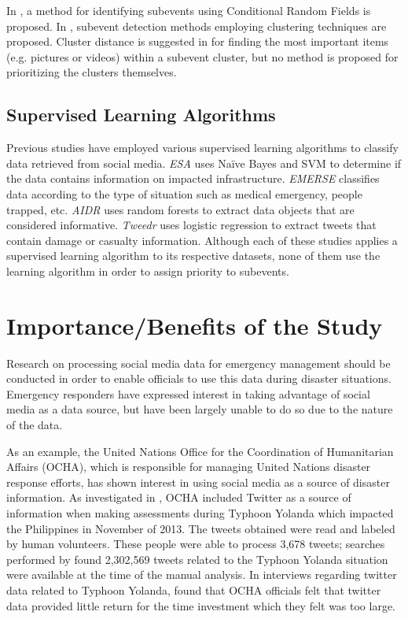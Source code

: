 \documentclass[conference]{IEEEtran}
\begin{document}
In \cite{Khurdiya}, a method for identifying subevents using Conditional Random Fields is proposed. In \cite{Pohl,Hua}, subevent detection methods employing clustering techniques are proposed. Cluster distance is suggested in \cite{Pohl} for finding the most important items (e.g. pictures or videos) within a subevent cluster, but no method is proposed for prioritizing the clusters themselves.

\subsection{Supervised Learning Algorithms}
Previous studies have employed various supervised learning algorithms to classify data retrieved from social media. \textit{ESA} \cite{yin}  uses Na\"{i}ve Bayes and SVM to determine if the data contains information on impacted infrastructure. \textit{EMERSE} \cite{caragea} classifies data according to the type of situation such as medical emergency, people trapped, etc. \textit{AIDR} \cite{Imran2014a} uses random forests to extract data objects that are considered informative. \textit{Tweedr} \cite{ashktorab} uses logistic regression to extract tweets that contain damage or casualty information. Although each of these studies applies a supervised learning algorithm to its respective datasets, none of them use the learning algorithm in order to assign priority to subevents.

\section{Importance/Benefits of the Study}
Research on processing social media data for emergency management should be conducted in order to enable officials to use this data during disaster situations. Emergency responders have expressed interest in taking advantage of social media as a data source, but have been largely unable to do so due to the nature of the data.

As an example, the United Nations Office for the Coordination of Humanitarian Affairs (OCHA), which is responsible for managing United Nations disaster response efforts, has shown interest in using social media as a source of disaster information. As investigated in \cite{vieweg2014}, OCHA included Twitter as a source of information when making assessments during Typhoon Yolanda which impacted the Philippines in November of 2013. The tweets obtained were read and labeled by human volunteers. These people were able to process 3,678 tweets; searches performed by \cite{vieweg2014} found 2,302,569 tweets related to the Typhoon Yolanda situation were available at the time of the manual analysis. In interviews regarding twitter data related to Typhoon Yolanda, \cite{vieweg2014} found that OCHA officials felt that twitter data provided little return for the time investment which they felt was too large.
\end{document}

